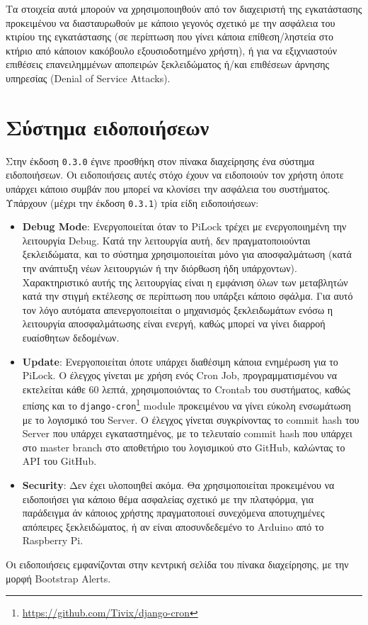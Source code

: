 	Τα στοιχεία αυτά μπορούν να χρησιμοποιηθούν από τον διαχειριστή της εγκατάστασης προκειμένου να διασταυρωθούν με κάποιο γεγονός σχετικό με την ασφάλεια του κτιρίου της εγκατάστασης (σε περίπτωση που γίνει κάποια επίθεση/ληστεία στο κτήριο από κάποιον κακόβουλο εξουσιοδοτημένο χρήστη), ή για να εξιχνιαστούν επιθέσεις επανειλημμένων αποπειρών ξεκλειδώματος ή/και επιθέσεων άρνησης υπηρεσίας (Denial of Service Attacks).

\section{Σύστημα ειδοποιήσεων}
	Στην έκδοση \verb|0.3.0| έγινε προσθήκη στον πίνακα διαχείρησης ένα σύστημα ειδοποιήσεων. Οι ειδοποιήσεις αυτές στόχο έχουν να ειδοποιούν τον χρήστη όποτε υπάρχει κάποιο συμβάν που μπορεί να κλονίσει την ασφάλεια του συστήματος. Υπάρχουν (μέχρι την έκδοση \verb|0.3.1|) τρία είδη ειδοποιήσεων:

	\begin{itemize}
		\item \textbf{Debug Mode}: Ενεργοποιείται όταν το PiLock τρέχει με ενεργοποιημένη την λειτουργία Debug. Κατά την λειτουργία αυτή, δεν πραγματοποιούνται ξεκλειδώματα, και το σύστημα χρησιμοποιείται μόνο για αποσφαλμάτωση (κατά την ανάπτυξη νέων λειτουργιών ή την διόρθωση ήδη υπάρχοντων). Χαρακτηριστικό αυτής της λειτουργίας είναι η εμφάνιση όλων των μεταβλητών κατά την στιγμή εκτέλεσης σε περίπτωση που υπάρξει κάποιο σφάλμα. Για αυτό τον λόγο αυτόματα απενεργοποιείται ο μηχανισμός ξεκλειδωμάτων ενόσω η λειτουργία αποσφαλμάτωσης είναι ενεργή, καθώς μπορεί να γίνει διαρροή ευαίσθητων δεδομένων.
		\item \textbf{Update}: Ενεργοποιείται όποτε υπάρχει διαθέσιμη κάποια ενημέρωση για το PiLock. Ο έλεγχος γίνεται με χρήση ενός Cron Job, προγραμματισμένου να εκτελείται κάθε 60 λεπτά, χρησιμοποιόντας το Crontab του συστήματος, καθώς επίσης και το \verb|django-cron|\footnote{\url{https://github.com/Tivix/django-cron}} module προκειμένου να γίνει εύκολη ενσωμάτωση με το λογισμικό του Server. Ο έλεγχος γίνεται συγκρίνοντας το commit hash του Server που υπάρχει εγκαταστημένος, με το τελευταίο commit hash που υπάρχει στο master branch στο αποθετήριο του λογισμικού στο GitHub, καλώντας το API του GitHub.
		\item \textbf{Security}: Δεν έχει υλοποιηθεί ακόμα. Θα χρησιμοποιείται προκειμένου να ειδοποιήσει για κάποιο θέμα ασφαλείας σχετικό με την πλατφόρμα, για παράδειγμα άν κάποιος χρήστης πραγματοποιεί συνεχόμενα αποτυχημένες απόπειρες ξεκλειδώματος, ή αν είναι αποσυνδεδεμένο το Arduino από το Raspberry Pi.
	\end{itemize}

	Οι ειδοποιήσεις εμφανίζονται στην κεντρική σελίδα του πίνακα διαχείρησης, με την μορφή Bootstrap Alerts.

